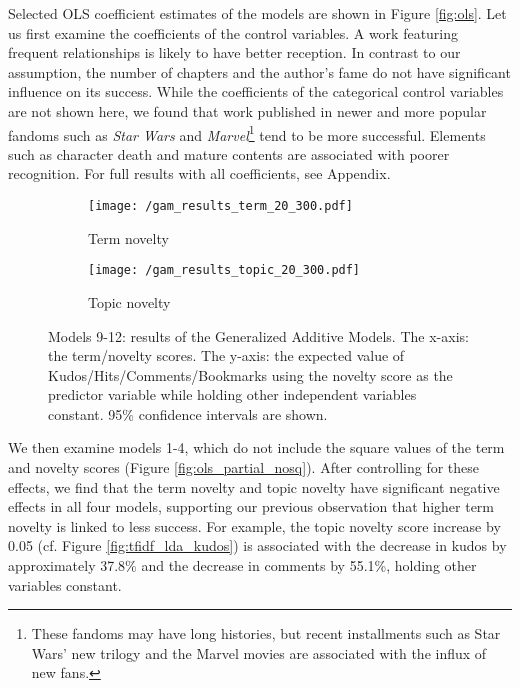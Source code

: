 \documentclass[letterpaper]{article} %
\begin{document}
Selected OLS coefficient estimates of the models are shown in Figure \ref{fig:ols}. Let us first examine the coefficients of the control variables. A work featuring frequent relationships is likely to have better reception. In contrast to our assumption, the number of chapters and the author's fame do not have significant influence on its success. While the coefficients of the categorical control variables are not shown here, we found that work published in newer and more popular fandoms such as \emph{Star Wars} and \emph{Marvel}\footnote{These fandoms may have long histories, but recent installments such as Star Wars' new trilogy and the Marvel movies are associated with the influx of new fans.} tend to be more successful. Elements such as character death and mature contents are associated with poorer recognition. For full results with all coefficients, see Appendix.

\begin{figure*}
\vspace{-1cm}
    \centering
    \begin{subfigure}{\textwidth}
          \texttt{[image: /gam\_results\_term\_20\_300.pdf]}
  		\caption{Term novelty} 
			\label{fig:gam_term}
       \end{subfigure}
      \begin{subfigure}{\textwidth}
          \texttt{[image: /gam\_results\_topic\_20\_300.pdf]}
		\caption{Topic novelty} 
		\label{fig:gam_topic}
       \end{subfigure}
           	\caption{Models 9-12: results of the Generalized Additive Models. The x-axis: the term/novelty scores. The y-axis: the expected value of Kudos/Hits/Comments/Bookmarks using the novelty score as the predictor variable while holding other independent variables constant. 95\% confidence intervals are shown.}
        \label{fig:gam}
\end{figure*}


We then examine models 1-4, which do not include the square values of the term and novelty scores (Figure \ref{fig:ols_partial_nosq}). After controlling for these effects, we find that the term novelty and topic novelty have significant negative effects in all four models, supporting our previous observation that higher term novelty is linked to less success. For example, the topic novelty score increase by 0.05 (cf. Figure \ref{fig:tfidf_lda_kudos}) is associated with the decrease in kudos by approximately 37.8\% and the decrease in comments by 55.1\%, holding other variables constant. 
\end{document}
